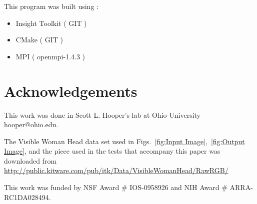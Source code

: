 \documentclass{InsightArticle}
\begin{document}
This program was built using :

\begin{itemize}
  \item  Insight Toolkit ( GIT )
  \item  CMake ( GIT )
  \item  MPI ( openmpi-1.4.3 )
\end{itemize}

\section{Acknowledgements}

This work was done in Scott L. Hooper's lab at Ohio University 
hooper@ohio.edu. 

The Visible Woman Head data set used in 
Figs.~\ref{fig:Input Image},~\ref{fig:Output Image}, and the 
piece used in the tests that accompany this paper was 
downloaded from 
\url{http://public.kitware.com/pub/itk/Data/VisibleWomanHead/RawRGB/}

This work was funded by NSF Award \# IOS-0958926 and NIH 
Award \# ARRA-RC1DA028494.






%
%
\end{document}
